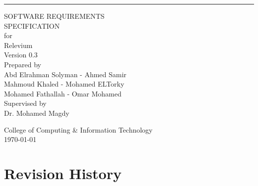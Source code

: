 \documentclass{scrreprt}
\date{\today}
\def\myversion{0.3}
\begin{document}
\begin{flushright}
    \rule{16cm}{5pt}\vskip1cm
    \begin{bfseries}
        \Huge{SOFTWARE REQUIREMENTS\\ SPECIFICATION}\\
        \vspace{1cm}
        for\\
        \vspace{1cm}
        Relevium\\
        \vspace{1cm}
        \LARGE{Version \myversion}\\
        \vspace{1cm}
        Prepared by\\
        Abd Elrahman Solyman - 
        Ahmed Samir \\
        Mahmoud Khaled -
        Mohamed ELTorky \\ 
        Mohamed Fathallah -
        Omar Mohamed\\
        
        \vspace{1cm}
        Supervised by\\
        Dr. Mohamed Magdy

        \vspace{1.2cm}
        College of Computing \& Information Technology\\
        \vspace{1.2cm}
        \today\\
    \end{bfseries}
\end{flushright}

\tableofcontents


\chapter*{Revision History}
\end{document}
